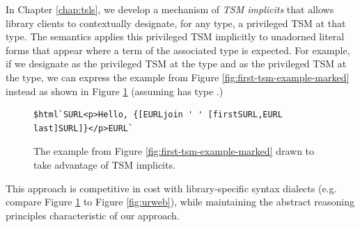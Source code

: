 In Chapter \ref{chap:tsls}, we develop a mechanism of \emph{TSM implicits} that allows library clients to contextually designate, for any type, a privileged TSM at that type. The semantics applies this privileged TSM implicitly to unadorned literal forms that appear where a term of the associated type is expected. For example, if we designate  as the privileged TSM at the  type and  as the privileged TSM at the  type, we can express the example from Figure \ref{fig:first-tsm-example-marked} instead as shown in Figure \ref{fig:first-tsm-example-implicit} (assuming  has type .) 
\begin{figure}[h]
\begin{lstlisting}[numbers=none]
$html`SURL<p>Hello, {[EURLjoin ' ' [firstSURL,EURL last]SURL]}</p>EURL`
\end{lstlisting}
\caption{The example from Figure \ref{fig:first-tsm-example-marked} drawn to take advantage of TSM implicits.}
\label{fig:first-tsm-example-implicit}
\end{figure}

\noindent This approach is competitive in cost with library-specific syntax dialects (e.g. compare Figure \ref{fig:first-tsm-example-implicit} to Figure \ref{fig:urweb}), while maintaining the abstract reasoning principles characteristic of our approach.


